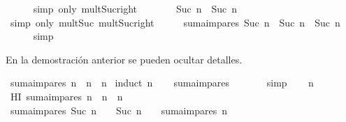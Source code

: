 \begin{isabellebody}
\ \ \ \ \isamarkupfalse%
\ {\isacharparenleft}simp\ only{\isacharcolon}\ mult{\isacharunderscore}Suc{\isacharunderscore}right{\isacharparenright}\isanewline
\ \ \isamarkupfalse%
\ \isamarkupfalse%
\ {\isachardoublequoteopen}{\isasymdots}\ {\isacharequal}\ {\isacharparenleft}Suc\ n{\isacharparenright}\ {\isacharasterisk}\ {\isacharparenleft}Suc\ n{\isacharparenright}{\isachardoublequoteclose}\isanewline
\ \ \ \ \isamarkupfalse%
\ {\isacharparenleft}simp\ only{\isacharcolon}\ mult{\isacharunderscore}Suc\ mult{\isacharunderscore}Suc{\isacharunderscore}right{\isacharparenright}\isanewline
\ \ \isamarkupfalse%
\ \isamarkupfalse%
\ {\isachardoublequoteopen}suma{\isacharunderscore}impares\ {\isacharparenleft}Suc\ n{\isacharparenright}\ {\isacharequal}\ {\isacharparenleft}Suc\ n{\isacharparenright}\ {\isacharasterisk}\ {\isacharparenleft}Suc\ n{\isacharparenright}{\isachardoublequoteclose}\ \isanewline
\ \ \ \ \isamarkupfalse%
\ simp\isanewline
{}\isamarkupfalse%
%
\endisatagproof
{\isafoldproof}%
%
\isadelimproof
%
\endisadelimproof
%
\begin{isamarkuptext}%
En la demostración anterior se pueden ocultar detalles.%
\end{isamarkuptext}\isamarkuptrue%
\isamarkupfalse%
\ {\isachardoublequoteopen}suma{\isacharunderscore}impares\ n\ {\isacharequal}\ n\ {\isacharasterisk}\ n{\isachardoublequoteclose}\isanewline
%
\isadelimproof
%
\endisadelimproof
%
\isatagproof
{}\isamarkupfalse%
\ {\isacharparenleft}induct\ n{\isacharparenright}\isanewline
\ \ \isamarkupfalse%
\ {\isachardoublequoteopen}suma{\isacharunderscore}impares\ {}\ {\isacharequal}\ {}\ {\isacharasterisk}\ {}{\isachardoublequoteclose}\ \isamarkupfalse%
\ simp\isanewline
{}\isamarkupfalse%
\isanewline
\ \ \isamarkupfalse%
\ n\ \isanewline
\ \ \isamarkupfalse%
\ HI{\isacharcolon}\ {\isachardoublequoteopen}suma{\isacharunderscore}impares\ n\ {\isacharequal}\ n\ {\isacharasterisk}\ n{\isachardoublequoteclose}\isanewline
\ \ \isamarkupfalse%
\ {\isachardoublequoteopen}suma{\isacharunderscore}impares\ {\isacharparenleft}Suc\ n{\isacharparenright}\ {\isacharequal}\ {\isacharparenleft}{}\ {\isacharasterisk}\ {\isacharparenleft}Suc\ n{\isacharparenright}\ {\isacharminus}\ {}{\isacharparenright}\ {\isacharplus}\ suma{\isacharunderscore}impares\ n{\isachardoublequoteclose}\ \isanewline

\end{isabellebody}
